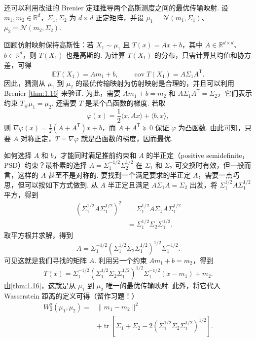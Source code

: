 \begin{example}[高斯最优传输]\label{ex:1.19}
还可以利用改进的 Brenier 定理推导两个高斯测度之间的最优传输映射. 设 $m_1,m_2\in\mathbb{R}^d$，$\Sigma_1,\Sigma_2$ 为 $d\times d$ 正定矩阵，并设 $\mu_1=\mathcal{N}(m_1,\Sigma_1)$、$\mu_2=\mathcal{N}(m_2,\Sigma_2)$.

回顾仿射映射保持高斯性：若 $X_1\sim\mu_1$ 且 $T(x)=Ax+b$，其中 $A\in\mathbb{R}^{d\times d}$、$b\in\mathbb{R}^d$，则 $T(X_1)$ 也是高斯的. 为计算 $T(X_1)$ 的分布，只需计算其均值和协方差，可得
$$
\mathbb{E}T(X_1)=Am_1+b,\qquad
\operatorname{cov}T(X_1)=A\Sigma_1A^{\mathsf{T}}.
$$
因此，猜测从 $\mu_1$ 到 $\mu_2$ 的最优传输映射为仿射映射是合理的，并且可以利用 Brenier \autoref{thm:1.16} 来验证. 为此，需要 $Am_1+b=m_2$ 和 $A\Sigma_1A^{\mathsf{T}}=\Sigma_2$，它们表示约束 $T_\#\mu_1=\mu_2$. 还需要 $T$ 是某个凸函数的梯度. 若取
$$
\varphi(x)=\frac12\langle x,Ax\rangle+\langle b,x\rangle,
$$
则 $\nabla\varphi(x)=\frac12(A+A^{\mathsf{T}})x+b$，而 $A+A^{\mathsf{T}}\succeq0$ 保证 $\varphi$ 为凸函数. 由此可知，只要 $A$ 对称正定，$T=\nabla\varphi$ 就是凸函数的梯度，因而最优.

如何选择 $A$ 和 $b$，才能同时满足推前约束和 $A$ 的半正定（positive semidefinite，PSD）约束？最朴素的选择 $A=\Sigma_1^{-1/2}\Sigma_2^{1/2}$ 在 $\Sigma_1$ 和 $\Sigma_2$ 可交换时有效，但一般而言，这样的 $A$ 甚至不是对称的. 要找到一个满足要求的半正定 $A$，需要一点巧思，但可以按如下方式做到. 从 $A$ 半正定且满足 $A\Sigma_1A=\Sigma_2$ 出发，将 $\Sigma_1^{1/2}A\Sigma_1^{1/2}$ 平方，得到
$$
\begin{aligned}
(\Sigma_1^{1/2}A\Sigma_1^{1/2})^2
&=\Sigma_1^{1/2}A\Sigma_1A\Sigma_1^{1/2}\\
&=\Sigma_1^{1/2}\Sigma_2\Sigma_1^{1/2}.
\end{aligned}
$$
取平方根并求解，得到
$$
A=\Sigma_1^{-1/2}(\Sigma_1^{1/2}\Sigma_2\Sigma_1^{1/2})^{1/2}\Sigma_1^{-1/2}.
$$
可见这就是我们寻找的矩阵 $A$. 利用另一个约束 $Am_1+b=m_2$，得到
$$
T(x)=\Sigma_1^{-1/2}(\Sigma_1^{1/2}\Sigma_2\Sigma_1^{1/2})^{1/2}
\Sigma_1^{-1/2}(x-m_1)+m_2.
$$
由\autoref{thm:1.16}，这就是从 $\mu_1$ 到 $\mu_2$ 唯一的最优传输映射. 此外，将它代入 Wasserstein 距离的定义可得（留作习题！）
\begin{equation}\label{eq:1.20}
\begin{aligned}
W_2^2(\mu_1,\mu_2)
={}&\|m_1-m_2\|^2\\
&+\operatorname{tr}\!\left[\Sigma_1+\Sigma_2
-2(\Sigma_1^{1/2}\Sigma_2\Sigma_1^{1/2})^{1/2}\right].
\end{aligned}
\end{equation}
\end{example}
